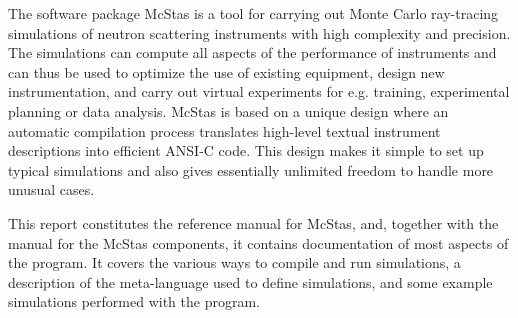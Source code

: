 The software package McStas is a tool for carrying out Monte Carlo
ray-tracing simulations of neutron scattering instruments with high
complexity and precision. The simulations can compute all aspects of the
performance of instruments and can thus be used to optimize the use of
existing equipment, design new instrumentation, and carry out virtual
experiments for e.g. training, experimental planning or data analysis. McStas
is based on a unique design where an automatic compilation process
translates high-level textual instrument descriptions into efficient
ANSI-C code. This design makes it simple to set up typical simulations
and also gives essentially unlimited freedom to handle more unusual
cases.

This report constitutes the reference manual for McStas, and,
together with the manual for the McStas components, it
contains documentation of most aspects of the program. It covers
the various ways to compile and run simulations, a description of the
meta-language used to define simulations, 
and some example simulations performed with
the program.
